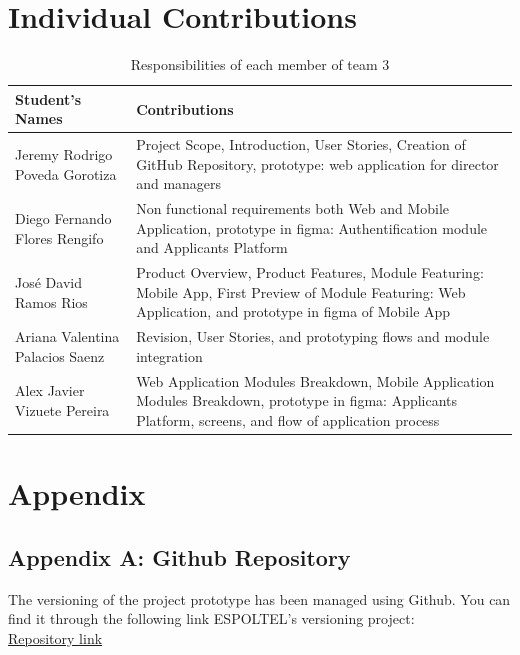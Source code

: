 \documentclass{scrreprt}
\begin{document}
    
\chapter{Individual Contributions}
\vspace{2cm}

\begin{table}[h!]
    \centering \small
    \renewcommand{\arraystretch}{1.5} %
    \begin{tabular}{|p{5cm}|p{10cm}|} %
    \hline
    \textbf{Student's Names} & \textbf{Contributions} \\ \hline
    Jeremy Rodrigo Poveda Gorotiza & Project Scope, Introduction, User Stories, Creation of GitHub Repository, prototype: web application for director and managers \\ \hline
    Diego Fernando Flores Rengifo & Non functional requirements both Web and Mobile Application, prototype in figma: Authentification module and Applicants Platform  \\ \hline
    José David Ramos Rios & Product Overview, Product Features, Module Featuring: Mobile App, First Preview of Module Featuring: Web Application, and prototype in figma of Mobile App \\ \hline
    Ariana Valentina Palacios Saenz & Revision, User Stories, and prototyping flows and module integration\\ \hline
    Alex Javier Vizuete Pereira & Web Application Modules Breakdown, Mobile Application Modules Breakdown, prototype in figma: Applicants Platform, screens, and flow of application process\\ \hline
    \end{tabular}
    \caption{Responsibilities of each member of team 3}
\end{table} \FloatBarrier 



\chapter{Appendix}

\section{Appendix A: Github Repository}
The versioning of the project prototype has been managed using Github. You can find it through the following link ESPOLTEL's versioning project:\\ \href{https://github.com/Jeremy-Poveda/EspoltelHiringManager}{Repository link}
\end{document}
